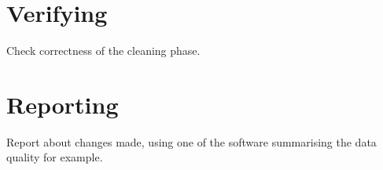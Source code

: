 \section{Verifying}
Check correctness of the cleaning phase.
\section{Reporting} 
Report about changes made, using one of the software summarising the data quality for 
example.
